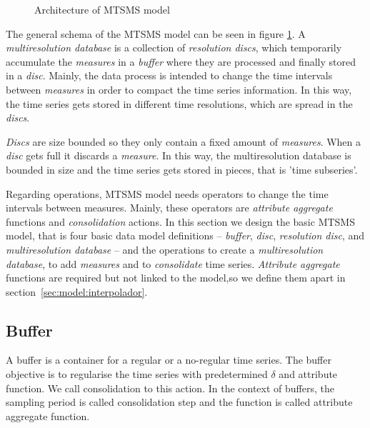 \begin{figure}[tp]
\centering
%

\caption{Architecture of MTSMS model}
\label{fig:model:mtsdb}
\end{figure}

The general schema of the MTSMS model can be seen in figure
\ref{fig:model:mtsdb}.  A \emph{multiresolution database} is a
collection of \emph{resolution discs}, which temporarily accumulate
the \emph{measures} in a \emph{buffer} where they are processed and
finally stored in a \emph{disc}. Mainly, the data process is intended
to change the time intervals between \emph{measures} in order to
compact the time series information. In this way, the time series gets
stored in different time resolutions, which are spread in the
\emph{discs}.

\emph{Discs} are size bounded so they only contain a fixed amount of
\emph{measures}. When a \emph{disc} gets full it discards a
\emph{measure}. In this way, the multiresolution database is bounded
in size and the time series gets stored in pieces, that is 'time
subseries'.




Regarding operations, MTSMS model needs operators to change the time
intervals between measures. Mainly, these operators are
\emph{attribute aggregate} functions and \emph{consolidation}
actions. In this section we design the basic MTSMS model, that is four
basic data model definitions -- \emph{buffer}, \emph{disc},
\emph{resolution disc}, and \emph{multiresolution database} -- and the
operations to create a \emph{multiresolution database}, to add
\emph{measures} and to \emph{consolidate} time series. \emph{Attribute
  aggregate} functions are required but not linked to the model,so we
define them apart in section~\ref{sec:model:interpolador}.






\subsection{Buffer}\label{sec:model:buffer}

A buffer is a container for a regular or a no-regular time series. The
buffer objective is to regularise the time series with predetermined $\delta$ 
and attribute function. We call consolidation to this action. In the context
of buffers, the sampling period is called consolidation step
and the function is called attribute aggregate function.

